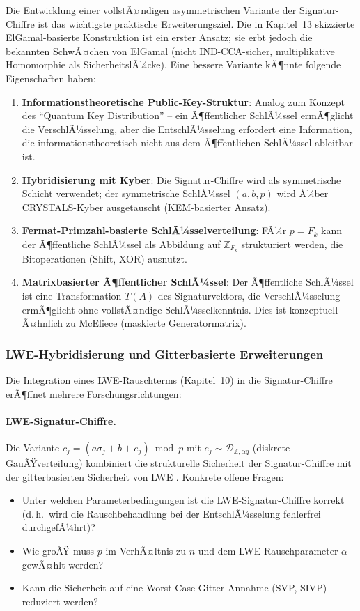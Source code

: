 ﻿\documentclass[a4paper,12pt]{scrreprt}
\theoremstyle{definition}
\begin{document}
Die Entwicklung einer vollstÃ¤ndigen asymmetrischen Variante der Signatur-Chiffre ist das wichtigste praktische Erweiterungsziel. Die in Kapitel~13 skizzierte ElGamal-basierte Konstruktion ist ein erster Ansatz; sie erbt jedoch die bekannten SchwÃ¤chen von ElGamal (nicht IND-CCA-sicher, multiplikative Homomorphie als SicherheitslÃ¼cke). Eine bessere Variante kÃ¶nnte folgende Eigenschaften haben:

\begin{enumerate}
  \item \textbf{Informationstheoretische Public-Key-Struktur}: Analog zum Konzept des ``Quantum Key Distribution'' -- ein Ã¶ffentlicher SchlÃ¼ssel ermÃ¶glicht die VerschlÃ¼sselung, aber die EntschlÃ¼sselung erfordert eine Information, die informationstheoretisch nicht aus dem Ã¶ffentlichen SchlÃ¼ssel ableitbar ist.
  \item \textbf{Hybridisierung mit Kyber}: Die Signatur-Chiffre wird als symmetrische Schicht verwendet; der symmetrische SchlÃ¼ssel $(a,b,p)$ wird Ã¼ber CRYSTALS-Kyber \cite{ABD+22} ausgetauscht (KEM-basierter Ansatz).
  \item \textbf{Fermat-Primzahl-basierte SchlÃ¼sselverteilung}: FÃ¼r $p = F_k$ kann der Ã¶ffentliche SchlÃ¼ssel als Abbildung auf $\mathbb{Z}_{F_k}$ strukturiert werden, die Bitoperationen (Shift, XOR) ausnutzt.
  \item \textbf{Matrixbasierter Ã¶ffentlicher SchlÃ¼ssel}: Der Ã¶ffentliche SchlÃ¼ssel ist eine Transformation $T(A)$ des Signaturvektors, die VerschlÃ¼sselung ermÃ¶glicht ohne vollstÃ¤ndige SchlÃ¼sselkenntnis. Dies ist konzeptuell Ã¤hnlich zu McEliece \cite{McE78} (maskierte Generatormatrix).
\end{enumerate}

\subsubsection{LWE-Hybridisierung und Gitterbasierte Erweiterungen}

Die Integration eines LWE-Rauschterms (Kapitel~10) in die Signatur-Chiffre erÃ¶ffnet mehrere Forschungsrichtungen:

\paragraph{LWE-Signatur-Chiffre.}
Die Variante $c_j = (a\sigma_j + b + e_j) \bmod p$ mit $e_j \sim \mathcal{D}_{\mathbb{Z},\alpha q}$ (diskrete GauÃŸverteilung) kombiniert die strukturelle Sicherheit der Signatur-Chiffre mit der gitterbasierten Sicherheit von LWE \cite{Reg05}. Konkrete offene Fragen:
\begin{itemize}
  \item Unter welchen Parameterbedingungen ist die LWE-Signatur-Chiffre korrekt (d.\,h.\ wird die Rauschbehandlung bei der EntschlÃ¼sselung fehlerfrei durchgefÃ¼hrt)?
  \item Wie groÃŸ muss $p$ im VerhÃ¤ltnis zu $n$ und dem LWE-Rauschparameter $\alpha$ gewÃ¤hlt werden?
  \item Kann die Sicherheit auf eine Worst-Case-Gitter-Annahme (SVP, SIVP) reduziert werden?
\end{itemize}
\end{document}
